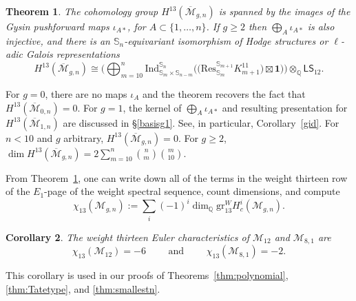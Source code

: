\documentclass[12pt]{amsart}
\newtheorem{thm}{Theorem}[section]
\newtheorem{cor}[thm]{Corollary}
\theoremstyle{definition}
\numberwithin{equation}{section}
\renewcommand{\ss}{\mathbb{S}}
\newcommand{\M}{\mathcal{M}}
\newcommand{\Q}{\mathbb{Q}}
\newcommand{\cM}{\mathcal{M}}
\newcommand{\Ind}{\mathrm{Ind}}
\newcommand{\lstw}{\mathsf{L}\mathsf{S}_{12}}
\newcommand{\Mb}{\overline{\M}}
\theoremstyle{definition} %
\theoremstyle{remark}
\newcommand{\gr}{\mathrm{gr}}
\begin{document}
\begin{thm}\label{thm:H13}
The cohomology group $H^{13}(\Mb_{g,n})$ is spanned by the images of the Gysin pushforward maps $\iota_{A*}$, for $A \subset \{1, \ldots, n\}$. If $g \geq 2$  then $\bigoplus_A \iota_{A*}$ is also injective, and there is an $\ss_n$-equivariant isomorphism of Hodge structures or $\ell$-adic Galois representations
\[
H^{13}(\Mb_{g,n}) \cong \bigg ( \bigoplus_{m = 10}^n \Ind_{\ss_m \times \ss_{n-m}}^{\ss_n} \Big(\big(\mathrm{Res}^{\ss_{m+1}}_{\ss_m}K^{11}_{m+1}\big) \boxtimes \mathbf{1}\Big) \bigg) \otimes_\Q \lstw.
\]
    \end{thm}

\noindent 
For $g = 0$, there are no maps $\iota_A$ and the theorem recovers the fact that $H^{13}(\Mb_{0,n}) = 0$.  For $g= 1$, the kernel of $\bigoplus_A \iota_{A*}$ and resulting presentation for $H^{13}(\Mb_{1,n})$ are discussed in \S\ref{basisg1}. See, in particular, Corollary~\ref{gid}. For $n<10$ and $g$ arbitrary, $H^{13}(\Mb_{g,n})=0$. For $g\geq 2$,  $\dim H^{13}(\Mb_{g,n})=2\sum_{m=10}^{n}\binom{n}{m}\binom{m}{10}$.

From Theorem~\ref{thm:H13}, one can write down all of the terms in the weight thirteen row of the $E_1$-page of the weight spectral sequence, count dimensions, and compute 
\[
\chi_{13}(\M_{g,n}) := \sum_i (-1)^i \dim_\Q \gr_{13}^W H^i_c(\cM_{g,n}).
\]

\begin{cor} \label{cor:chi13}
The weight thirteen Euler characteristics of $\M_{12}$ and $\M_{8,1}$ are 
\[
\chi_{13}(\cM_{12}) = -6 \quad \quad \mbox{ and } \quad \quad \chi_{13}(\cM_{8,1}) = -2.
\]
\end{cor}

\noindent This corollary is used in our proofs of Theorems~\ref{thm:polynomial}, \ref{thm:Tatetype}, and \ref{thm:smallestn}.
\end{document}
